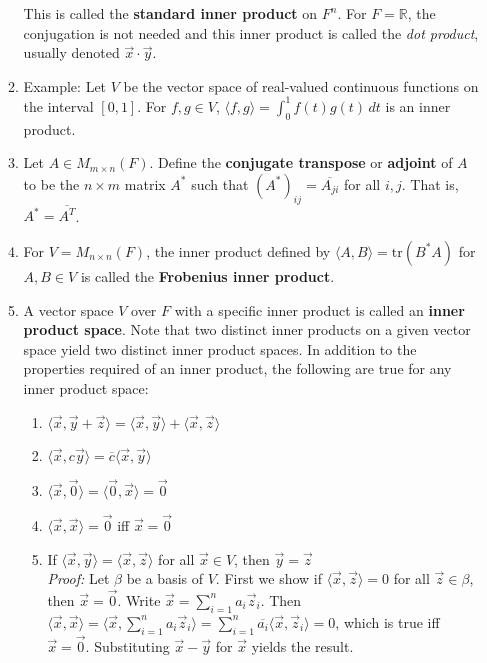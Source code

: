 \documentclass[10pt]{article}
\begin{document}
\begin{multicols*}{2}
\begin{enumerate}
\begin{enumerate}
        This is called the \textbf{standard inner product} on $F^n$. For $F=\mathbb{R}$, the conjugation is not needed and this inner product is called the \textit{dot product}, usually denoted $\vec{x} \cdot \vec{y}$.
        \item Example: Let $V$ be the vector space of real-valued continuous functions on the interval $[0,1]$. For $f,g\in V$, $\langle f, g \rangle = \int_0^1 f(t)g(t) \,dt$ is an inner product.
        \item Let $A \in M_{m \times n}(F)$. Define the \textbf{conjugate transpose} or \textbf{adjoint} of $A$ to be the $n \times m$ matrix $A^*$ such that $(A^*)_{ij} = \overline{A_{ji}}$ for all $i,j$. That is, $A^* = \overline{A^T}$.
        \item For $V = M_{n \times n}(F)$, the inner product defined by $\langle A, B \rangle = \text{tr}(B^*A)$ for $A,B\in V$ is called the \textbf{Frobenius inner product}.
        \item A vector space $V$ over $F$ with a specific inner product is called an \textbf{inner product space}. Note that two distinct inner products on a given vector space yield two distinct inner product spaces. In addition to the properties required of an inner product, the following are true for any inner product space:
        \begin{enumerate}
            \item $\langle \vec{x}, \vec{y} + \vec{z} \rangle = \langle \vec{x}, \vec{y} \rangle + \langle \vec{x}, \vec{z} \rangle$
            \item $\langle \vec{x}, c\vec{y} \rangle = \overline{c}\langle \vec{x}, \vec{y} \rangle$
            \item $\langle \vec{x}, \vec{0} \rangle = \langle \vec{0}, \vec{x} \rangle = \vec{0}$
            \item $\langle \vec{x}, \vec{x} \rangle = \vec{0}$ iff $\vec{x} = \vec{0}$
            \item If $\langle \vec{x}, \vec{y} \rangle = \langle \vec{x}, \vec{z} \rangle$ for all $\vec{x} \in V$, then $\vec{y}=\vec{z}$ \\
            \textit{Proof:} Let $\beta$ be a basis of $V$. First we show if $\langle \vec{x}, \vec{z} \rangle = 0$ for all $\vec{z} \in \beta$, then $\vec{x}=\vec{0}$. Write $\vec{x}=\sum_{i=1}^n a_i\vec{z}_i$. Then $\langle \vec{x}, \vec{x} \rangle = \langle \vec{x}, \sum_{i=1}^n a_i\vec{z}_i \rangle = \sum_{i=1}^n \overline{a_i} \langle \vec{x}, \vec{z}_i \rangle = 0$, which is true iff $\vec{x}=\vec{0}$. Substituting $\vec{x} - \vec{y}$ for $\vec{x}$ yields the result.
        \end{enumerate}
        

\end{enumerate}
\end{enumerate}
\end{multicols*}
\end{document}
